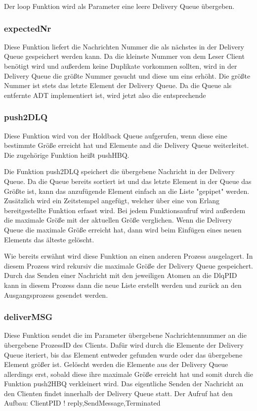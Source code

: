 Der loop Funktion wird als Parameter eine leere Delivery Queue übergeben. 

\subsubsection{expectedNr}

Diese Funktion liefert die Nachrichten Nummer die als nächstes in der Delivery Queue gespeichert werden kann. Da die kleinste Nummer von dem Leser Client benötigt wird und außerdem keine Duplikate vorkommen sollten, wird in der Delivery Queue die größte Nummer gesucht und diese um eins erhöht. Die größte Nummer ist stets das letzte Element der Delivery Queue. 
Da die Queue als entfernte ADT implementiert ist, wird jetzt also die entsprechende 

\subsubsection{push2DLQ}

Diese Funktion wird von der Holdback Queue aufgerufen, wenn diese eine bestimmte Größe erreicht hat und Elemente and die Delivery Queue weiterleitet. Die zugehörige Funktion heißt pushHBQ.

Die Funktion push2DLQ speichert die übergebene Nachricht in der Delivery Queue. Da die Queue bereits sortiert ist und das letzte Element in der Queue das Größte ist, kann das anzufügende Element einfach an die Liste "gepipet" werden. Zusätzlich wird ein Zeitstempel angefügt, welcher über eine von Erlang bereitgestellte Funktion erfasst wird. 
Bei jedem Funktionsaufruf wird außerdem die maximale Größe mit der aktuellen Größe verglichen. Wenn die Delivery Queue die maximale Größe erreicht hat, dann wird beim Einfügen eines neuen Elements das älteste gelöscht. 

Wie bereits erwähnt wird diese Funktion an einen anderen Prozess ausgelagert. In diesem Prozess wird rekursiv die maximale Größe der Delivery Queue gespeichert. Durch das Senden einer Nachricht mit den jeweiligen Atomen an die DlqPID kann in diesem Prozess dann die neue Liste erstellt werden und zurück an den Ausgangsprozess gesendet werden. 

\subsubsection{deliverMSG}

Diese Funktion sendet die im Parameter übergebene Nachrichtennummer an die übergebene ProzessID des Clients. Dafür wird durch die Elemente der Delivery Queue iteriert, bis das Element entweder gefunden wurde oder das übergebene Element größer ist. 
Gelöscht werden die Elemente aus der Delivery Queue allerdings erst, sobald diese ihre maximale Größe erreicht hat und somit durch die Funktion push2HBQ verkleinert wird. 
Das eigentliche Senden der Nachricht an den Clienten findet innerhalb der Delivery Queue statt. 
Der Aufruf hat den Aufbau:
ClientPID ! {reply,SendMessage,Terminated}

